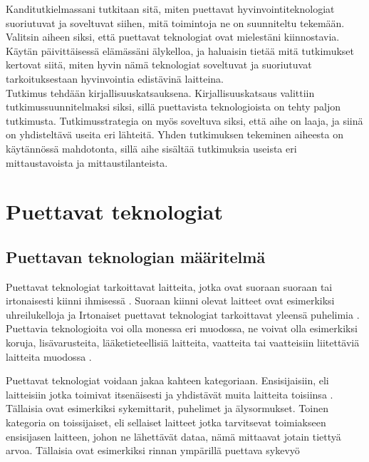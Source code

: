 \documentclass[utf8,bachelor,finnish]{bachelor}
\begin{document}
  Kanditutkielmassani tutkitaan sitä, miten puettavat hyvinvointiteknologiat suoriutuvat ja soveltuvat siihen, mitä toimintoja ne on suunniteltu tekemään.
   Valitsin aiheen siksi, että puettavat teknologiat ovat mielestäni kiinnostavia. Käytän päivittäisessä elämässäni älykelloa, ja haluaisin tietää mitä tutkimukset kertovat
    siitä, miten hyvin nämä teknologiat soveltuvat ja suoriutuvat tarkoituksestaan hyvinvointia edistävinä laitteina.\\

  Tutkimus tehdään kirjallisuuskatsauksena. Kirjallisuuskatsaus valittiin tutkimussuunnitelmaksi siksi, sillä puettavista teknologioista on tehty paljon tutkimusta.
   Tutkimusstrategia on myös soveltuva siksi, että aihe on laaja, ja siinä on yhdisteltävä useita eri lähteitä. Yhden tutkimuksen tekeminen aiheesta on käytännössä mahdotonta,
    sillä aihe sisältää tutkimuksia useista eri mittaustavoista ja mittaustilanteista.
   
\chapter{Puettavat teknologiat}

\section{Puettavan teknologian määritelmä}
  Puettavat teknologiat tarkoittavat laitteita, jotka ovat suoraan suoraan tai irtonaisesti
   kiinni ihmisessä \parencite{godfrey2018z}. Suoraan kiinni olevat laitteet ovat esimerkiksi uhreilukelloja ja
    Irtonaiset puettavat teknologiat tarkoittavat yleensä puhelimia \parencite{godfrey2018z}. Puettavia teknologioita voi olla
     monessa eri muodossa, ne voivat olla esimerkiksi koruja, lisävarusteita, lääketieteellisiä laitteita, vaatteita tai
      vaatteisiin liitettäviä laitteita muodossa \parencite{Yasar_what_wearable}.
    
  Puettavat teknologiat voidaan jakaa kahteen kategoriaan. Ensisijaisiin, eli laitteisiin jotka toimivat itsenäisesti
   ja yhdistävät muita laitteita toisiinsa \parencite{godfrey2018z}. Tällaisia ovat esimerkiksi sykemittarit, puhelimet ja älysormukset.
    Toinen kategoria on toissijaiset, eli sellaiset laitteet jotka tarvitsevat toimiakseen ensisijasen laitteen, johon ne lähettävät dataa, 
     nämä mittaavat jotain tiettyä arvoa. Tällaisia ovat esimerkiksi rinnan ympärillä puettava sykevyö \parencite{godfrey2018z} \\
\end{document}
